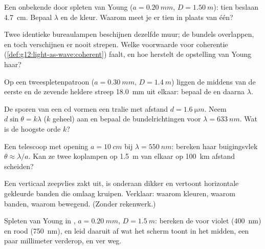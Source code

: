 \begin{exercise}[$\star\star$]\label{exo:g12:light-as-wave:7}
Een onbekende  door spleten van Young ($a = \qty{0.20}{mm}$,
$D = \qty{1.50}{m}$): tien  beslaan \qty{4.7}{cm}. Bepaal
$\lambda$ en de kleur. Waarom meet je er tien in plaats van één?
\end{exercise}

\begin{exercise}[$\star\star$]\label{exo:g12:light-as-wave:8}
Twee identieke bureaulampen beschijnen dezelfde muur; de bundels
overlappen, en toch verschijnen er nooit strepen. Welke voorwaarde voor
coherentie (\cref{def:g12:light-as-wave:coherent}) faalt, en hoe herstelt
de opstelling van Young haar?
\end{exercise}

\begin{exercise}[$\star\star$]\label{exo:g12:light-as-wave:9}
Op een tweespletenpatroon ($a = \qty{0.30}{mm}$, $D = \qty{1.4}{m}$)
liggen de middens van de eerste en de zevende heldere streep \qty{18.0}{mm}
uit elkaar: bepaal de  en daarna $\lambda$.
\end{exercise}

\begin{exercise}[$\star\star$]\label{exo:g12:light-as-wave:10}
De sporen van een cd vormen een tralie met afstand
$d = \qty{1.6}{\micro m}$. Neem $d \sin\theta = k\lambda$ ($k$ geheel) aan
en bepaal de bundelrichtingen voor $\lambda = \qty{633}{nm}$. Wat is de
hoogste orde $k$?
\end{exercise}

\begin{exercise}[$\star\star$]\label{exo:g12:light-as-wave:11}
Een telescoop met opening $a = \qty{10}{cm}$ bij
$\lambda = \qty{550}{nm}$: bereken haar buigingsvlek
$\theta \approx \lambda/a$. Kan ze twee koplampen op \qty{1.5}{m} van
elkaar op \qty{100}{km} afstand scheiden?
\end{exercise}

\begin{exercise}[$\star\star\star$]\label{exo:g12:light-as-wave:12}
Een verticaal zeepvlies zakt uit, is onderaan dikker en vertoont
horizontale gekleurde banden die omlaag kruipen. Verklaar: waarom
kleuren, waarom banden, waarom bewegend. (Zonder rekenwerk.)
\end{exercise}

\begin{exercise}[$\star\star\star$]\label{exo:g12:light-as-wave:13}
Spleten van Young in , $a = \qty{0.20}{mm}$, $D = \qty{1.5}{m}$:
bereken de  voor violet (\qty{400}{nm}) en rood
(\qty{750}{nm}), en leid daaruit af wat het scherm toont in het midden,
een paar millimeter verderop, en ver weg.
\end{exercise}

